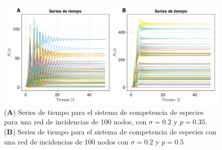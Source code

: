 \\
\begin{figure}[h!]
	\centering
	\includegraphics[scale=0.23]{../../Imagenes/Series de Tiempo LK100}
	\caption{(\textbf{A}) Series de tiempo para el sistema de competencia de especies para una red de incidencias de 100 nodos, con $\sigma=0.2$ y $p=0.35$. (\textbf{B}) Series de tiempo para el sistema de competencia de especies con una red de incidencias de 100 nodos con $\sigma=0.2$ y $p=0.5$}
	\label{fig:SeriesdeTiempoLK100}
\end{figure}

